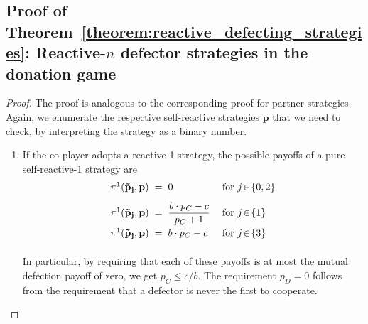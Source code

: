 \documentclass[9pt,twoside,lineno]{pnas-new}
\theoremstyle{plainCl1}
\theoremstyle{plainCl2}
\begin{document}
\subsection{Proof of Theorem~\ref{theorem:reactive_defecting_strategies}:
Reactive-$n$ defector strategies in the donation game}
\begin{proof}
The proof is analogous to the corresponding proof for partner strategies. Again, we enumerate the respective self-reactive strategies $\mathbf{\tilde p}$ that we need to check, by interpreting the strategy as a binary number. 
\begin{enumerate}
\item If the co-player adopts a reactive-1 strategy, the possible payoffs of a pure self-reactive-1 strategy are
\begin{equation*}\label{Eq:PayoffExpressionsDefectiveReactiveOne}
\setlength{\arraycolsep}{1mm}
  \begin{array}{lcll}
   \pi^1(\mathbf{\tilde p_j},\mathbf{p}) &= &\displaystyle 0 & ~~\text{for}~ j\! \in\!  \{0, 2\} \\[0.3cm]
   \pi^1(\mathbf{\tilde p_j},\mathbf{p}) &= &\displaystyle  \frac{b \cdot p_{C} - c}{p_{C} + 1}  & ~~\text{for}~ j\! \in\!  \{1\} \\[0.3cm]
   \pi^1(\mathbf{\tilde p_j},\mathbf{p}) &= &\displaystyle  b \cdot p_{C} - c  & ~~\text{for}~ j\! \in\!  \{3\} \\[0.3cm]
  \end{array}
\end{equation*}
In particular, by requiring that each of these payoffs is at most the mutual defection payoff of zero, we get $p_C\!\le\! c/b$. The requirement $p_D\!=\!0$ follows from the requirement that a defector is never the first to cooperate.\\


\end{enumerate}
\end{proof}
\end{document}
